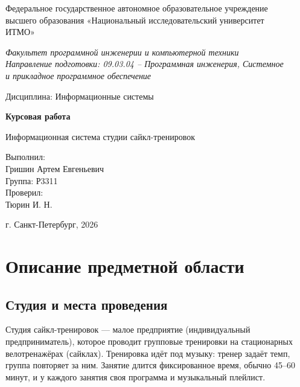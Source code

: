 \documentclass[14pt,a4paper]{extarticle}
\newcommand{\teacher}{Тюрин И. Н.}
\begin{document}
\begin{titlepage}
  \centering
  \vspace*{5mm}
  Федеральное государственное автономное образовательное учреждение\\
  высшего образования «Национальный исследовательский университет\\
  ИТМО»\par
  \vspace{4mm}
  \textit{Факультет программной инженерии и компьютерной техники}\\
  \textit{Направление подготовки: 09.03.04 -- Программная инженерия, Системное}\\
  \textit{и прикладное программное обеспечение}\par
  \vspace{18mm}
  Дисциплина: Информационные системы\par
  \vspace{30mm}
  {\large\bfseries Курсовая работа\par}
  \vspace{1mm}
  {\large Информационная система студии сайкл-тренировок\par}
  \vfill
  \begin{flushright}
    Выполнил:\\
    Гришин Артем Евгеньевич\\
    Группа: Р3311\\[3mm]
    Проверил:\\
    \teacher
  \end{flushright}
  \vspace{25mm}
  г. Санкт-Петербург, 2026\par
\end{titlepage}

\tableofcontents
\newpage

\section{Описание предметной области}

\subsection{Студия и места проведения}

Студия сайкл-тренировок --- малое предприятие (индивидуальный предприниматель), которое проводит групповые тренировки на стационарных велотренажёрах (сайклах). Тренировка идёт под музыку: тренер задаёт темп, группа повторяет за ним. Занятие длится фиксированное время, обычно 45--60 минут, и у каждого занятия своя программа и музыкальный плейлист.
\end{document}

